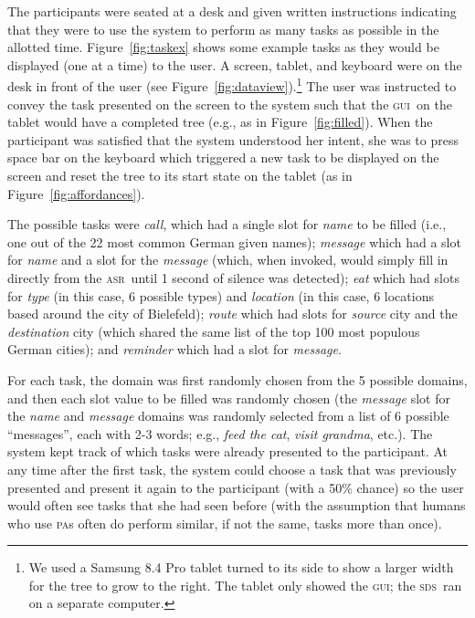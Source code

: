 \documentclass[11pt]{article}
\newcommand{\sds}[0]{\textsc{sds}}
\newcommand{\asr}[0]{\textsc{asr}}
\newcommand{\ui}[0]{\textsc{gui}}
\newcommand{\pa}[0]{\textsc{pa}}
\begin{document}
The participants were seated at a desk and given written instructions indicating that they were to use the system to perform as many tasks as possible in the allotted time. Figure~\ref{fig:taskex} shows some example tasks as they would be displayed (one at a time) to the user. A screen, tablet, and keyboard were on the desk in front of the user (see Figure~\ref{fig:dataview}).\footnote{We used a Samsung 8.4 Pro tablet turned to its side to show a larger width for the tree to grow to the right. The tablet only showed the \ui; the \sds\ ran on a separate computer.}  The user was instructed to convey the task presented on the screen to the system such that the \ui\ on the tablet would have a completed tree (e.g., as in Figure~\ref{fig:filled}). When the participant was satisfied that the system understood her intent, she was to press space bar on the keyboard which triggered a new task to be displayed on the screen and reset the tree to its start state on the tablet (as in Figure~\ref{fig:affordances}). 

The possible tasks were \emph{call}, which had a single slot for \emph{name} to be filled (i.e., one out of the 22 most common German given names); \emph{message} which had a slot for \emph{name} and a slot for the \emph{message} (which, when invoked, would simply fill in directly from the \asr\ until 1 second of silence was detected); \emph{eat} which had slots for \emph{type} (in this case, 6 possible types) and \emph{location} (in this case, 6 locations based around the city of Bielefeld); \emph{route} which had slots for \emph{source} city and the \emph{destination} city (which shared the same list of the top 100 most populous German cities); and \emph{reminder} which had a slot for \emph{message}. 


For each task, the domain was first randomly chosen from the 5 possible domains, and then each slot value to be filled was randomly chosen (the \emph{message} slot for the \emph{name} and \emph{message} domains was randomly selected from a list of 6 possible ``messages'', each with 2-3 words; e.g., \emph{feed the cat}, \emph{visit grandma}, etc.). The system kept track of which tasks were already presented to the participant. At any time after the first task, the system could choose a task that was previously presented and present it again to the participant (with a 50\% chance) so the user would often see tasks that she had seen before (with the assumption that humans who use \pa s often do perform similar, if not the same, tasks more than once). 
\end{document}

